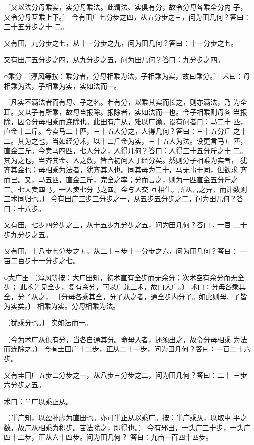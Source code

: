 \documentclass[12pt,UTF8]{ctexbook}
\begin{document}
〔又以法分母乘实，实分母乘法。此谓法、实俱有分，故令分母各乘全分内 子，又令分母互乘上下。〕 今有田广七分步之四，从五分步之三，问为田几何？答曰：三十五分步之十 二。

又有田广九分步之七，从十一分步之九，问为田几何？答曰：十一分步之七。

又有田广五分步之四，从九分步之五，问为田几何？答曰：九分步之四。

○乘分 〔淳风等按：乘分者，分母相乘为法，子相乘为实，故曰乘分。〕 术曰：母相乘为法，子相乘为实，实如法而一。

〔凡实不满法者而有母、子之名。若有分，以乘其实而长之，则亦满法，乃 为全耳。又以子有所乘，故母当报除。报除者，实如法而一也。今子相乘则母各 当报除，因令分母相乘而连除也。此田有广从，难以广谕。设有问者曰：马二十 匹，直金十二斤。今卖马二十匹，三十五人分之，人得几何？答曰：三十五分斤 之十二。其为之也，当如经分术，以十二斤金为实，三十五人为法。设更言马五 匹，直金三斤。今卖马四匹，七人分之，人得几何？答曰：人得三十五分斤之十 二。其为之也，当齐其金、人之数，皆合初问入于经分矣。然则分子相乘为实者， 犹齐其金也；母相乘为法者，犹齐其人也。同其母为二十，马无事于同，但欲求 齐而已。又，马五匹，直金三斤，完全之率；分而言之，则为一匹直金五分斤之 三。七人卖四马，一人卖七分马之四。金与人交 互相生。所从言之异，而计数则 三术同归也。〕 今有田广三步三分步之一，从五步五分步之二，问为田几何？答曰：十八步。

又有田广七步四分步之三，从十五步九分步之五，问为田几何？答曰：一百 二十步九分步之五。

又有田广十八步七分步之五，从二十三步十一分步之六，问为田几何？答曰： 一亩二百步十一分步之七。

○大广田 〔淳风等按：大广田知，初术直有全步而无余分；次术空有余分而无全步； 此术先见全步，复有余分，可以广兼三术，故曰大广。〕 术曰：分母各乘其全，分子从之， 〔分母各乘其全，分子从之者，通全步内分子。如此则母、子皆为实矣。〕 相乘为实。分母相乘为法。

〔犹乘分也。〕 实如法而一。

〔今为术广从俱有分，当各自通其分。命母入者，还须出之，故令分母相乘 为法而连除之。〕 今有圭田广十二步，正从二十一步，问为田几何？答曰：一百二十六步。

又有圭田广五步二分步之一，从八步三分步之二，问为田几何？答曰：二十 三步六分步之五。

术曰：半广以乘正从。

〔半广知，以盈补虚为直田也。亦可半正从以乘广。按：半广乘从，以取中 平之数，故广从相乘为积步。亩法除之，即得也。〕 今有邪田，一头广三十步，一头广四十二步，正从六十四步。问为田几何？ 答曰：九亩一百四十四步。
\end{document}
